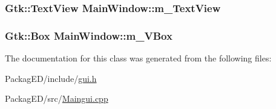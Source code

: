 \subsubsection[{\texorpdfstring{m\+\_\+\+Text\+View}{m_TextView}}]{\setlength{\rightskip}{0pt plus 5cm}Gtk\+::\+Text\+View Main\+Window\+::m\+\_\+\+Text\+View\hspace{0.3cm}{\ttfamily [private]}}\hypertarget{class_main_window_ad0e686fded3dc2b398152a81797e6f9c}{}\label{class_main_window_ad0e686fded3dc2b398152a81797e6f9c}
\subsubsection[{\texorpdfstring{m\+\_\+\+V\+Box}{m_VBox}}]{\setlength{\rightskip}{0pt plus 5cm}Gtk\+::\+Box Main\+Window\+::m\+\_\+\+V\+Box\hspace{0.3cm}{\ttfamily [private]}}\hypertarget{class_main_window_a4c78dd9410eb57879f400e1e05bb5043}{}\label{class_main_window_a4c78dd9410eb57879f400e1e05bb5043}


The documentation for this class was generated from the following files\+:\begin{DoxyCompactItemize}
\item 
Packag\+E\+D/include/\hyperlink{gui_8h}{gui.\+h}\item 
Packag\+E\+D/src/\hyperlink{_maingui_8cpp}{Maingui.\+cpp}\end{DoxyCompactItemize}
